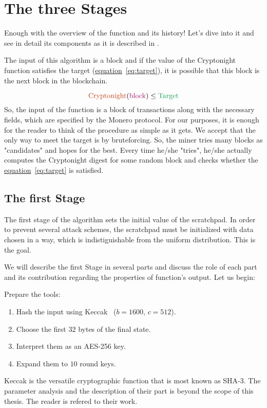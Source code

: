 \section{The three Stages}
Enough with the overview of the function and its history! Let's dive into it and see in detail its components as it is described in \cite{cryptonight}.

The input of this algorithm is a block and if the value of the Cryptonight function satisfies the target (\hyperref[eq:target]{equation}~\ref{eq:target}), it is possible that this block is the next block in the blockchain.

\begin{equation}
  \label{eq:target}
  \color{Bittersweet} \mbox{Cryptonight}
  \color{black} (
  \color{RedViolet} \mbox{block}
  \color{black} )\leq
  \color{ForestGreen} \mbox{Target}
  \color{black}
\end{equation}
So, the input of the function is a block of transactions along with the necessary fields, which are specified by the Monero protocol. For our purposes, it is enough for the reader to think of the procedure as simple as it gets. We accept that the only way to meet the target is by bruteforcing. So, the miner tries many blocks as "candidates" and hopes for the best. Every time he/she "tries", he/she actually computes the Cryptonight digest for some random block and checks whether the \hyperref[eq:target]{equation}~\ref{eq:target} is satisfied.

\subsection{The first Stage}
The first stage of the algorithm sets the initial value of the scratchpad. In order to prevent several attack schemes, the scratchpad must be initialized with data chosen in a way, which is indistiguishable from the uniform distribution. This is the goal.

We will describe the first Stage in several parts and discuss the role of each part and its contribution regarding the properties of function's output. Let us begin:

\noindent Prepare the tools:
\begin{enumerate}
  \item \label{hashing} Hash the input using Keccak~\cite{keccak} ($b=1600$, $c=512$).
  \item Choose the first $32$ bytes of the final state.
  \item Interpret them as an AES-256 key.
  \item Expand them to $10$ round keys.
\end{enumerate}
Keccak is the versatile cryptographic function that is most known as SHA-3. The parameter analysis and the description of their part is beyond the scope of this thesis. The reader is refered to their work.

